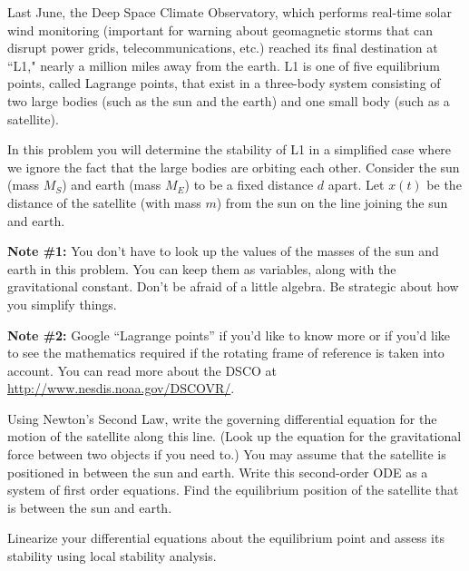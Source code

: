 \documentclass[boxes]{gsypset}
\begin{document}
	\begin{problem}
		Last June, the Deep Space Climate Observatory, which performs real-time solar wind monitoring 
		(important for warning about geomagnetic storms that can 
		disrupt power grids, telecommunications, etc.) reached its final destination at ``L1," 
		nearly a million miles away from the earth.  
		L1 is one of five equilibrium points, called Lagrange points, 
		that exist in a three-body system consisting of two large bodies 
		(such as the sun and the earth) and one small body (such as a satellite).
		
		In this problem you will determine the stability of L1 in a simplified case 
		where we ignore the fact that the large bodies are orbiting each other. 
		Consider the sun (mass $M_S$) and earth (mass $M_E$) to be a fixed distance $d$ apart. 
		Let $x(t)$ be the distance of the satellite (with mass $m$) from the sun 
		on the line joining the sun and earth.
		
		\textbf{Note \#1:} 
			You don't have to look up the values of the masses of the sun and earth in this problem. 
			You can keep them as variables, along with the gravitational constant. 
			Don't be afraid of a little algebra. 
			Be strategic about how you simplify things.
		
		\textbf{Note \#2:} 
			Google ``Lagrange points'' if you'd like to know more or 
			if you'd like to see the mathematics required 
			if the rotating frame of reference is taken into account. 
			You can read more about the DSCO at \url{http://www.nesdis.noaa.gov/DSCOVR/}.
		
		\begin{subproblems}
			\subproblem 
				Using Newton's Second Law, write the governing differential equation for 
				the motion of the satellite along this line. 
				(Look up the equation for the gravitational force between two objects if you need to.) 
				You may assume that the satellite is positioned in between the sun and earth. 
				Write this second-order ODE as a system of first order equations. 
				Find the equilibrium position of the satellite that is between the sun and earth.
				\begin{solution}
					
				\end{solution}
			\subproblem 
				Linearize your differential equations about the equilibrium point and 
				assess its stability using local stability analysis.
				\begin{solution}
					
				\end{solution}
		\end{subproblems}
	\end{problem}
\end{document}
